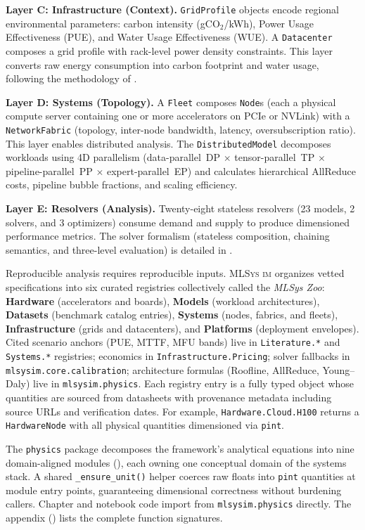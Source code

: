 \documentclass[10pt,twocolumn]{article}
\newcommand{\mlsysim}{\mbox{\textsc{MLSys}\,\textperiodcentered\,\textsc{im}}\xspace}
\begin{document}
\textbf{Layer C: Infrastructure (Context).} \texttt{GridProfile} objects encode regional environmental parameters: carbon intensity (gCO$_2$/kWh), Power Usage Effectiveness (PUE), and Water Usage Effectiveness (WUE). A \texttt{Datacenter} composes a grid profile with rack-level power density constraints. This layer converts raw energy consumption into carbon footprint and water usage, following the methodology of \citet{patterson2021carbon}.

\textbf{Layer D: Systems (Topology).} A \texttt{Fleet} composes \texttt{Node}s (each a physical compute server containing one or more accelerators on PCIe or NVLink) with a \texttt{NetworkFabric} (topology, inter-node bandwidth, latency, oversubscription ratio). This layer enables distributed analysis. The \texttt{DistributedModel} decomposes workloads using 4D parallelism (data-parallel~DP $\times$ tensor-parallel~TP $\times$ pipeline-parallel~PP $\times$ expert-parallel~EP) and calculates hierarchical AllReduce costs, pipeline bubble fractions, and scaling efficiency.

\textbf{Layer E: Resolvers (Analysis).} Twenty-eight stateless resolvers (23 models, 2 solvers, and 3 optimizers) consume demand and supply to produce dimensioned performance metrics. The solver formalism (stateless composition, chaining semantics, and three-level evaluation) is detailed in .

Reproducible analysis requires reproducible inputs. \mlsysim organizes vetted specifications into six curated registries collectively called the \emph{MLSys Zoo}: \textbf{Hardware} (accelerators and boards), \textbf{Models} (workload architectures), \textbf{Datasets} (benchmark catalog entries), \textbf{Systems} (nodes, fabrics, and fleets), \textbf{Infrastructure} (grids and datacenters), and \textbf{Platforms} (deployment envelopes). Cited scenario anchors (PUE, MTTF, MFU bands) live in \texttt{Literature.*} and \texttt{Systems.*} registries; economics in \texttt{Infrastructure.Pricing}; solver fallbacks in \texttt{mlsysim.core.calibration}; architecture formulas (Roofline, AllReduce, Young--Daly) live in \texttt{mlsysim.physics}. Each registry entry is a fully typed object whose quantities are sourced from datasheets with provenance metadata including source URLs and verification dates. For example, \texttt{Hardware.Cloud.H100} returns a \texttt{HardwareNode} with all physical quantities dimensioned via \texttt{pint}.

The \texttt{physics} package decomposes the framework's analytical equations into nine domain-aligned modules (), each owning one conceptual domain of the systems stack. A shared \texttt{\_ensure\_unit()} helper coerces raw floats into \texttt{pint} quantities at module entry points, guaranteeing dimensional correctness without burdening callers. Chapter and notebook code import from \texttt{mlsysim.physics} directly. The appendix () lists the complete function signatures.
\end{document}
